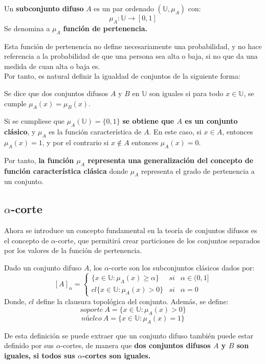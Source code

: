 \begin{definicion}
  \label{def:subconjunto_difuso}
  
  Un \textbf{subconjunto difuso} $A$ es un par ordenado $(\mathbb{U}, \mu_A)$ con:
  \[
  \mu_A : \mathbb{U} \longrightarrow [0,1]
  \]
  Se denomina a $\mu_A$ \textbf{función de pertenencia.}
\end{definicion}

Esta función de pertenencia no define necesariamente una probabilidad, y no hace referencia a la probabilidad de que una persona sea alta o baja, si no que da una medida de cuan alta o baja es.\\ 

Por tanto, es natural definir la igualdad de conjuntos de la siguiente forma:

\begin{definicion}
  \label{def:igualdad}
  Se dice que dos conjuntos difusos $A$ y $B$ en $\mathbb{U}$ son iguales si para todo $x \in \mathbb{U}$, se cumple $\mu_A(x) = \mu_B(x)$.
\end{definicion}

Si se cumpliese que $\mu_A(\mathbb{U})=\{0, 1\}$ \textbf{se obtiene que $A$ es un conjunto clásico}, y $\mu_A$ es la función característica de $A$. En este caso, si $x \in A$, entonces $\mu_A(x)=1$, y por el contrario si $x \notin A$ entonces $\mu_A(x)=0$.

Por tanto, \textbf{la función $\mu_A$ representa una generalización del concepto de función característica clásica} donde $\mu_A$ representa el grado de pertenencia a un conjunto.

\subsection{$\alpha$-corte}
Ahora se introduce un concepto fundamental en la teoría de conjuntos difusos es el concepto de $\alpha$-corte, que permitirá crear particiones de los conjuntos separados por los valores de la función de pertenencia.
\begin{definicion}
  \label{def:alpha_corte}
  Dado un conjunto difuso $A$, los $\alpha$-corte son los subconjuntos clásicos dados por:
  \[
    [A]_\alpha = \left\{
    \begin{array}{ccc}
      \{x \in \mathbb{U} : \mu_A(x) \geq \alpha \} & si & \alpha \in (0, 1] \\
      cl\{x \in \mathbb{U} : \mu_A(x) > 0\} & si & \alpha=0
    \end{array}
    \right.
    \]
    Donde, $cl$ define la clausura topológica del conjunto. Además, se define:
    \[
    soporte ~ A = \{x \in \mathbb{U} : \mu_A(x) > 0 \}
    \]
    \[
    núcleo ~ A = \{x \in \mathbb{U} : \mu_A(x) = 1 \}
    \]
\end{definicion}
De esta definición se puede extraer que un conjunto difuso también puede estar definido por sus $\alpha$-cortes, de manera que \textbf{dos conjuntos difusos $A$ y $B$ son iguales, si todos sus $\alpha$-cortes son iguales.} 

